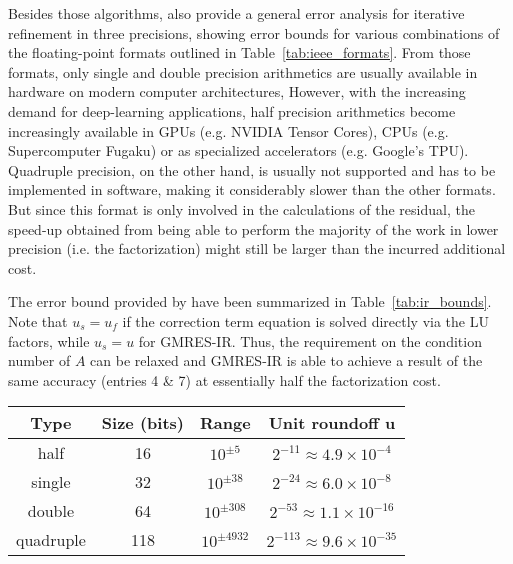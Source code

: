 Besides those algorithms, \cite{carson_accelerating_2018} also provide a general error analysis for iterative refinement in three precisions, showing error bounds for various combinations of the floating-point formats outlined in Table~\hyperref[tab:ieee_formats]{\ref{tab:ieee_formats}}. From those formats, only single and double precision arithmetics are usually available in hardware on modern computer architectures, However, with the increasing demand for deep-learning applications, half precision arithmetics become increasingly available in GPUs (e.g. NVIDIA Tensor Cores), CPUs (e.g. Supercomputer Fugaku) or as specialized accelerators (e.g. Google's TPU). Quadruple precision, on the other hand, is usually not supported and has to be implemented in software, making it considerably slower than the other formats. But since this format is only involved in the calculations of the residual, the speed-up obtained from being able to perform the majority of the work in lower precision (i.e. the factorization) might still be larger than the incurred additional cost.

The error bound provided by \cite{carson_accelerating_2018} have been summarized in Table~\hyperref[tab:ir_bounds]{\ref{tab:ir_bounds}}. Note that $u_s = u_f$ if the correction term equation is solved directly via the LU factors, while $u_s=u$ for GMRES-IR. Thus, the requirement on the condition number of $A$ can be relaxed and GMRES-IR is able to achieve a result of the same accuracy (entries 4 \& 7) at essentially half the factorization cost.

\begin{table*}[h]
\setlength{\tabcolsep}{10pt} %
  \begin{center}
    \begin{tabular}{c  c  c  c}
     \textbf{Type} & \textbf{Size} (bits) & \textbf{Range} & \textbf{Unit roundoff $\bm{u}$}\\
     \toprule
    half & 16 & $10^{\pm5}$ & $2^{-11}\approx 4.9 \times 10^{-4}$ \\
    single & 32 & $10^{\pm38}$ & $2^{-24}\approx 6.0 \times 10^{-8}$ \\
    double & 64 & $10^{\pm308}$ & $2^{-53}\approx 1.1 \times 10^{-16}$ \\
    quadruple & 118 & $10^{\pm4932}$ & $2^{-113}\approx 9.6 \times 10^{-35}$\\
    \end{tabular}
        \caption[IEEE Arithmetic Precisions]{Arithmetic precisions for IEEE floating-point formats.}
    \label{tab:ieee_formats}
  \end{center}
\end{table*}


